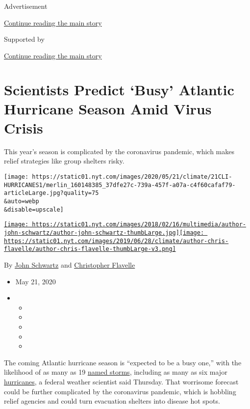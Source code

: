 Advertisement

\protect\hyperlink{after-top}{Continue reading the main story}

Supported by

\protect\hyperlink{after-sponsor}{Continue reading the main story}

\hypertarget{scientists-predict-busy-atlantic-hurricane-season-amid-virus-crisis}{%
\section{Scientists Predict `Busy' Atlantic Hurricane Season Amid Virus
Crisis}\label{scientists-predict-busy-atlantic-hurricane-season-amid-virus-crisis}}

This year's season is complicated by the coronavirus pandemic, which
makes relief strategies like group shelters risky.

\texttt{[image: https://static01.nyt.com/images/2020/05/21/climate/21CLI-HURRICANES1/merlin\_160148385\_37dfe27c-739a-457f-a07a-c4f60cafaf79-articleLarge.jpg?quality=75\\\&auto=webp\\\&disable=upscale]}

\href{https://www.nytimes.com/by/john-schwartz}{\texttt{[image: https://static01.nyt.com/images/2018/02/16/multimedia/author-john-schwartz/author-john-schwartz-thumbLarge.jpg]}}\href{https://www.nytimes.com/by/christopher-flavelle}{\texttt{[image: https://static01.nyt.com/images/2019/06/28/climate/author-chris-flavelle/author-chris-flavelle-thumbLarge-v3.png]}}

By \href{https://www.nytimes.com/by/john-schwartz}{John Schwartz} and
\href{https://www.nytimes.com/by/christopher-flavelle}{Christopher
Flavelle}

\begin{itemize}
\item
  May 21, 2020
\item
  \begin{itemize}
  \item
  \item
  \item
  \item
  \item
  \end{itemize}
\end{itemize}

The coming Atlantic hurricane season is ``expected to be a busy one,''
with the likelihood of as many as 19
\href{https://www.nytimes.com/2020/06/05/us/tropical-storm-cristobal-louisiana.html}{named
storms}, including as many as six major
\href{https://www.nytimes.com/interactive/2020/07/25/us/hurricane-hanna-tracker-map.html}{hurricanes},
a federal weather scientist said Thursday. That worrisome forecast could
be further complicated by the coronavirus pandemic, which is hobbling
relief agencies and could turn evacuation shelters into disease hot
spots.

